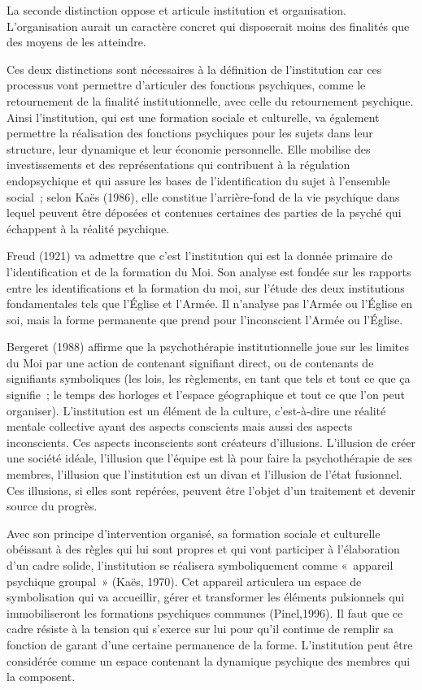 \documentclass[12pt, a4paper]{book}
\begin{document}
\begin{spacing}{1.5}
La seconde distinction oppose et articule institution et organisation. L'organisation aurait un caractère concret qui disposerait moins des finalités que des moyens de les atteindre.

Ces deux distinctions sont nécessaires à la définition de l'institution car ces processus vont permettre d'articuler des fonctions psychiques, comme le retournement de la finalité institutionnelle, avec celle du retournement psychique. Ainsi l'institution, qui est une formation sociale et culturelle, va également permettre la réalisation des fonctions psychiques pour les sujets dans leur structure, leur dynamique et leur économie personnelle. Elle mobilise des investissements et des représentations qui contribuent à la régulation endopsychique et qui assure les bases de l'identification du sujet à l'ensemble social ; selon Kaës (1986), elle constitue l'arrière-fond de la vie psychique dans lequel peuvent être déposées et contenues certaines des parties de la psyché qui échappent à la réalité psychique.

Freud (1921) va admettre que c'est l'institution qui est la donnée primaire de l'identification et de la formation du Moi. Son analyse est fondée sur les rapports entre les identifications et la formation du moi, sur l'étude des deux institutions fondamentales tels que l'Église et l'Armée. Il n'analyse pas l'Armée ou l'Église en soi, mais la forme permanente que prend pour l'inconscient l'Armée ou l'Église.

Bergeret (1988) affirme que la psychothérapie institutionnelle joue sur les limites du Moi par une action de contenant signifiant direct, ou de contenants de signifiants symboliques (les lois, les règlements, en tant que tels et tout ce que ça signifie ; le temps des horloges et l'espace géographique et tout ce que l'on peut organiser). L'institution est un élément de la culture, c'est-à-dire une réalité mentale collective ayant des aspects conscients mais aussi des aspects inconscients. Ces aspects inconscients sont créateurs d'illusions. L'illusion de créer une société idéale, l'illusion que l'équipe est là pour faire la psychothérapie de ses membres, l'illusion que l'institution est un divan et l'illusion de l'état fusionnel. Ces illusions, si elles sont repérées, peuvent être l'objet d'un traitement et devenir source du progrès.

Avec son principe d'intervention organisé, sa formation sociale et culturelle obéissant à des règles qui lui sont propres et qui vont participer à l'élaboration d'un cadre solide, l'institution se réalisera symboliquement comme « appareil psychique groupal » (Kaës, 1970).  Cet appareil articulera un espace de symbolisation qui va accueillir, gérer et transformer les éléments pulsionnels qui immobiliseront les formations psychiques communes (Pinel,1996). Il faut que ce cadre résiste à la tension qui s'exerce sur lui pour qu'il continue de remplir sa fonction de garant d'une certaine permanence de la forme. L'institution peut être considérée comme un espace contenant la dynamique psychique des membres qui la composent. 


\end{spacing}
\end{document}
